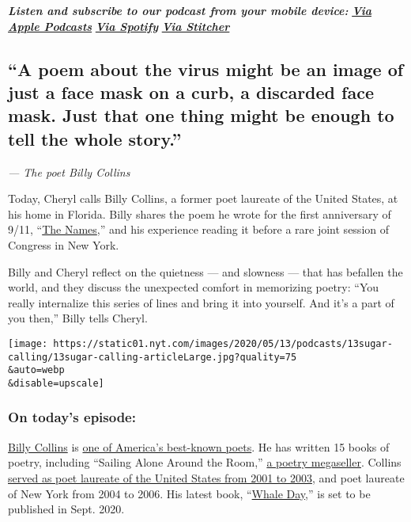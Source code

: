 \emph{\textbf{Listen and subscribe to our podcast from your mobile
device:}}
\textbf{\href{https://podcasts.apple.com/us/podcast/sugar-calling/id1505881384}{\emph{Via
Apple Podcasts}}} \emph{\textbf{\textbar{}}}
\textbf{\href{https://open.spotify.com/show/4U8hPiNGIBvTS9zLeiDCN7?si=gRyigD47SPWl-QWgNjgt2w}{\emph{Via
Spotify}}} \emph{\textbf{\textbar{}}}
\textbf{\href{https://www.stitcher.com/podcast/the-new-york-times/sugar-calling}{\emph{Via
Stitcher}}}

\hypertarget{a-poem-about-the-virus-might-be-an-image-of-just-a-face-mask-on-a-curb-a-discarded-face-mask-just-that-one-thing-might-be-enough-to-tell-the-whole-story}{%
\subsection{``A poem about the virus might be an image of just a face
mask on a curb, a discarded face mask. Just that one thing might be
enough to tell the whole
story.''}\label{a-poem-about-the-virus-might-be-an-image-of-just-a-face-mask-on-a-curb-a-discarded-face-mask-just-that-one-thing-might-be-enough-to-tell-the-whole-story}}

\emph{--- The poet Billy Collins}

Today, Cheryl calls Billy Collins, a former poet laureate of the United
States, at his home in Florida. Billy shares the poem he wrote for the
first anniversary of 9/11,
``\href{https://www.nytimes.com/2002/09/06/opinion/the-names.html}{The
Names},'' and his experience reading it before a rare joint session of
Congress in New York.

Billy and Cheryl reflect on the quietness --- and slowness --- that has
befallen the world, and they discuss the unexpected comfort in
memorizing poetry: ``You really internalize this series of lines and
bring it into yourself. And it's a part of you then,'' Billy tells
Cheryl.

\texttt{[image: https://static01.nyt.com/images/2020/05/13/podcasts/13sugar-calling/13sugar-calling-articleLarge.jpg?quality=75\\\&auto=webp\\\&disable=upscale]}

\hypertarget{on-todays-episode}{%
\subsubsection{\texorpdfstring{\textbf{On today's
episode:}}{On today's episode:}}\label{on-todays-episode}}

\href{https://www.poetryfoundation.org/poets/billy-collins}{Billy
Collins} is
\href{https://www.nytimes.com/2004/10/07/books/poetry-starts-to-wear-100-million-crown.html}{one
of America's best-known poets}. He has written 15 books of poetry,
including ``Sailing Alone Around the Room,''
\href{https://www.nytimes.com/2001/11/18/nyregion/citypeople-the-selling-of-billy-collins.html}{a
poetry megaseller}. Collins
\href{https://www.nytimes.com/2013/11/17/opinion/sunday/billy-collins.html}{served
as poet laureate of the United States from 2001 to 2003}, and poet
laureate of New York from 2004 to 2006. His latest book,
``\href{https://www.penguinrandomhouse.com/books/547113/whale-day-by-billy-collins/}{Whale
Day},'' is set to be published in Sept. 2020.

